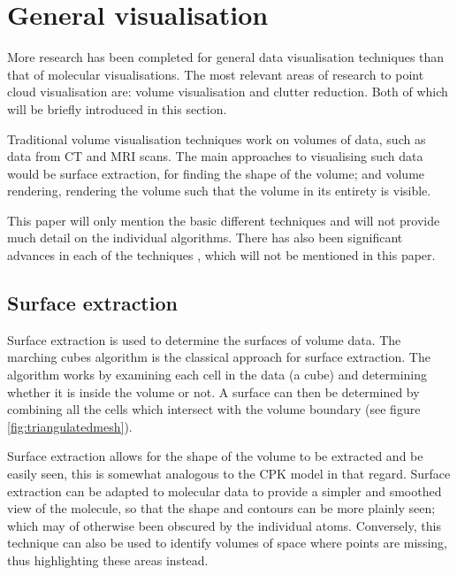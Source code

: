 

\section{General visualisation}
\label{sec:generalvis}

More research has been completed for general data visualisation techniques than
that of molecular visualisations. The most relevant areas of research to point
cloud visualisation are: volume visualisation and clutter reduction. Both of
which will be briefly introduced in this section.

Traditional volume visualisation techniques work on volumes of data, such as
data from CT and MRI scans. The main approaches to visualising such data would
be surface extraction, for finding the shape of the volume; and volume
rendering, rendering the volume such that the volume in its entirety is
visible.

This paper will only mention the basic different techniques and will not provide
much detail on the individual algorithms. There has also been significant
advances in each of the techniques \citep{brodlie01}, which will not be
mentioned in this paper.

\subsection{Surface extraction}
\label{sub:surface_extraction}

Surface extraction is used to determine the surfaces of volume data. The
marching cubes algorithm \citep{lorensen87} is the classical approach for
surface extraction. The algorithm works by examining each cell in the data (a
cube) and determining whether it is inside the volume or not. A surface can
then be determined by combining all the cells which intersect with the volume
boundary (see figure \ref{fig:triangulatedmesh}).

Surface extraction allows for the shape of the volume to be extracted and be
easily seen, this is somewhat analogous to the CPK model in that regard.
Surface extraction can be adapted to molecular data to provide a simpler and
smoothed view of the molecule, so that the shape and contours can be more
plainly seen; which may of otherwise been obscured by the individual atoms.
Conversely, this technique can also be used to identify volumes of space where
points are missing, thus highlighting these areas instead.

